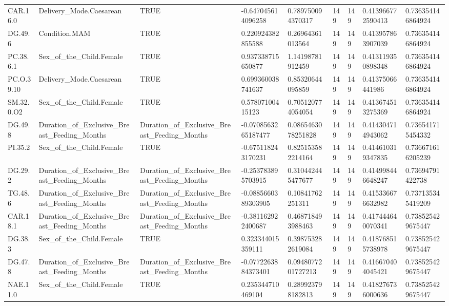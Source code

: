 \begin{longtable}{lllllllll}
CAR.16.0 & Delivery\_Mode.Caesarean & TRUE & -0.647045614096258 & 0.789750094370317 & 149 & 149 & 0.413966772590413 & 0.736354146864924 \\
DG.49.6 & Condition.MAM & TRUE & 0.220924382855588 & 0.26964361013564 & 149 & 149 & 0.413957863907039 & 0.736354146864924 \\
PC.38.6.1 & Sex\_of\_the\_Child.Female & TRUE & 0.937338715650877 & 1.14198781912459 & 149 & 149 & 0.413119350898348 & 0.736354146864924 \\
PC.O.39.10 & Delivery\_Mode.Caesarean & TRUE & 0.699360038741637 & 0.85320644095859 & 149 & 149 & 0.41375066441986 & 0.736354146864924 \\
SM.32.0.O2 & Sex\_of\_the\_Child.Female & TRUE & 0.57807100415123 & 0.705120774054054 & 149 & 149 & 0.413674513275369 & 0.736354146864924 \\
DG.49.8 & Duration\_of\_Exclusive\_Breast\_Feeding\_Months & Duration\_of\_Exclusive\_Breast\_Feeding\_Months & -0.0708563265187477 & 0.0865463078251828 & 149 & 149 & 0.414304714943062 & 0.736541715454332 \\
PI.35.2 & Sex\_of\_the\_Child.Female & TRUE & -0.675118243170231 & 0.825153582214164 & 149 & 149 & 0.414610319347835 & 0.736671616205239 \\
DG.29.2 & Duration\_of\_Exclusive\_Breast\_Feeding\_Months & Duration\_of\_Exclusive\_Breast\_Feeding\_Months & -0.253783895703915 & 0.310442445477677 & 149 & 149 & 0.414998446648247 & 0.73694791422738 \\
TG.48.6 & Duration\_of\_Exclusive\_Breast\_Feeding\_Months & Duration\_of\_Exclusive\_Breast\_Feeding\_Months & -0.0885660389303905 & 0.10841762251311 & 149 & 149 & 0.415336676632982 & 0.737135345419209 \\
CAR.18.1 & Duration\_of\_Exclusive\_Breast\_Feeding\_Months & Duration\_of\_Exclusive\_Breast\_Feeding\_Months & -0.381162922400687 & 0.468718493988463 & 149 & 149 & 0.417444640070341 & 0.738525429675447 \\
DG.38.3 & Sex\_of\_the\_Child.Female & TRUE & 0.323344015359111 & 0.398753282619084 & 149 & 149 & 0.418768515738978 & 0.738525429675447 \\
DG.47.8 & Duration\_of\_Exclusive\_Breast\_Feeding\_Months & Duration\_of\_Exclusive\_Breast\_Feeding\_Months & -0.0772263884373401 & 0.0948077201727213 & 149 & 149 & 0.416670404045421 & 0.738525429675447 \\
NAE.11.0 & Sex\_of\_the\_Child.Female & TRUE & 0.235344710469104 & 0.289923798182813 & 149 & 149 & 0.418276736000636 & 0.738525429675447 \\

\end{longtable}
